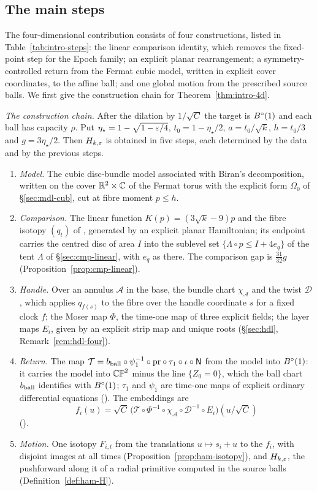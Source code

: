 \subsection{The main steps}\label{sec:intro-steps}

The four-dimensional contribution consists of four constructions, listed in Table~\ref{tab:intro-steps}: the linear
comparison identity, which removes the fixed-point step for the Epoch family; an explicit planar rearrangement; a
symmetry-controlled return from the Fermat cubic model, written in explicit cover coordinates, to the affine ball;
and one global motion from the prescribed source balls. We first give the construction chain for
Theorem~\ref{thm:intro-4d}.

\emph{The construction chain.} After the dilation by $1/\sqrt C$ the target is $B^{\circ}(1)$ and each ball has capacity $\rho$.
Put $\eta_\star=1-\sqrt{1-\varepsilon/4}$, $t_0=1-\eta_\star/2$, $a=t_0/\sqrt k$, $h=t_0/3$ and $g=3\eta_\star/2$. Then $H_{k,\varepsilon}$ is
obtained in five steps, each determined by the data and by the previous steps.
\begin{enumerate}[label=(\arabic*)]
\item \emph{Model.} The cubic disc-bundle model associated with Biran's decomposition, written on the cover $\mathbb{R}^2\times\mathbb{C}$ of the Fermat torus with the
 explicit form $\Omega_0$ of \S\ref{sec:mdl-cub}, cut at fibre moment $p\le h$.
\item \emph{Comparison.} The linear function $K(p)=(3\sqrt k-9)p$ and the fibre isotopy $(q_t)$ of
 , generated by an explicit planar Hamiltonian; its endpoint carries the centred disc of
 area $I$ into the sublevel set $\{\Lambda\circ p\le I+4e_q\}$ of the tent $\Lambda$ of \S\ref{sec:cmp-linear}, with $e_q$ as there. The
 comparison gap is $\frac{31}{32}g$ (Proposition~\ref{prop:cmp-linear}).
\item \emph{Handle.} Over an annulus $\mathcal A$ in the base, the bundle chart $\chi_{\mathcal A}$ and the twist
 $\mathcal D$, which applies $q_{f(s)}$ to the fibre over the handle coordinate $s$ for a fixed clock $f$; the Moser map
 $\Phi$, the time-one map of three explicit fields; the layer maps $E_i$, given by an explicit strip map and unique
 roots (\S\ref{sec:hdl}, Remark~\ref{rem:hdl-four}).
\item \emph{Return.} The map $\mathcal T=b_{\rm ball}\circ\psi_1^{-1}\circ\mathrm{pr}\circ\tau_1\circ\iota\circ\mathsf N$
 from the model into $B^{\circ}(1)$: it carries the model into $\mathbb{CP}^2$ minus the line $\{Z_0=0\}$, which the ball chart
 $b_{\rm ball}$ identifies with $B^{\circ}(1)$; $\tau_1$ and $\psi_1$ are time-one maps of explicit ordinary differential
 equations (). The embeddings are
 \[
  f_i(u)=\sqrt C\,\bigl(\mathcal T\circ\Phi^{-1}\circ\chi_{\mathcal A}\circ\mathcal D^{-1}\circ E_i\bigr)(u/\sqrt C)
 \]
 ().
\item \emph{Motion.} One isotopy $F_{i,t}$ from the translations $u\mapsto s_i+u$ to the $f_i$, with disjoint images at all
 times (Proposition~\ref{prop:ham-isotopy}), and $H_{k,\varepsilon}$, the pushforward along it of a radial primitive computed in
 the source balls (Definition~\ref{def:ham-H}).
\end{enumerate}
